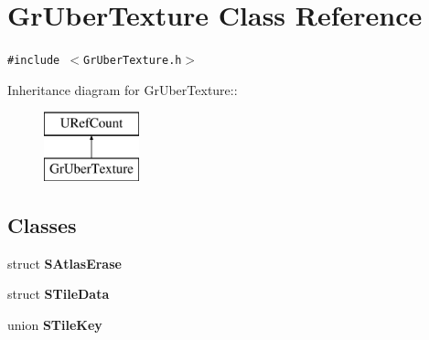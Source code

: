 \hypertarget{class_gr_uber_texture}{
\section{GrUberTexture Class Reference}
\label{class_gr_uber_texture}
}
{\tt \#include $<$GrUberTexture.h$>$}

Inheritance diagram for GrUberTexture::\begin{figure}[H]
\begin{center}
\leavevmode
\includegraphics[height=2cm]{class_gr_uber_texture}
\end{center}
\end{figure}
\subsection*{Classes}
\begin{CompactItemize}
\item 
struct \textbf{SAtlasErase}
\item 
struct \textbf{STileData}
\item 
union \textbf{STileKey}
\end{CompactItemize}
